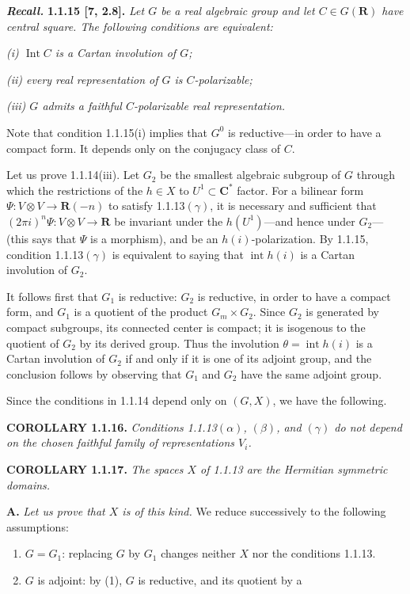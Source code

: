 \documentclass[10pt,a4paper]{article}
\begin{document}
\textbf{\emph{Recall.}} \textbf{1.1.15 {[}7, 2.8{]}.} \emph{Let \(G\) be a real algebraic group and let \(C\in G(\mathbf R)\) have central square. The following conditions are equivalent:}

\emph{(i) \(\operatorname{Int}C\) is a Cartan involution of \(G\);}

\emph{(ii) every real representation of \(G\) is \(C\)-polarizable;}

\emph{(iii) \(G\) admits a faithful \(C\)-polarizable real representation.}

Note that condition 1.1.15(i) implies that \(G^0\) is reductive---in order to have a compact form. It depends only on the conjugacy class of \(C\).

Let us prove 1.1.14(iii). Let \(G_2\) be the smallest algebraic subgroup of \(G\) through which the restrictions of the \(h\in X\) to \(U^1\subset\mathbf C^*\) factor. For a bilinear form \(\Psi:V\otimes V\to\mathbf R(-n)\) to satisfy 1.1.13\((\gamma)\), it is necessary and sufficient that \((2\pi i)^n\Psi:V\otimes V\to\mathbf R\) be invariant under the \(h(U^1)\)---and hence under \(G_2\)---(this says that \(\Psi\) is a morphism), and be an \(h(i)\)-polarization. By 1.1.15, condition 1.1.13\((\gamma)\) is equivalent to saying that \(\operatorname{int}h(i)\) is a Cartan involution of \(G_2\).

It follows first that \(G_1\) is reductive: \(G_2\) is reductive, in order to have a compact form, and \(G_1\) is a quotient of the product \(G_m\times G_2\). Since \(G_2\) is generated by compact subgroups, its connected center is compact; it is isogenous to the quotient of \(G_2\) by its derived group. Thus the involution \(\theta=\operatorname{int}h(i)\) is a Cartan involution of \(G_2\) if and only if it is one of its adjoint group, and the conclusion follows by observing that \(G_1\) and \(G_2\) have the same adjoint group.

Since the conditions in 1.1.14 depend only on \((G,X)\), we have the following.

\textbf{COROLLARY 1.1.16.} \emph{Conditions 1.1.13\((\alpha)\), \((\beta)\), and \((\gamma)\) do not depend on the chosen faithful family of representations \(V_i\).}

\textbf{COROLLARY 1.1.17.} \emph{The spaces \(X\) of 1.1.13 are the Hermitian symmetric domains.}

\textbf{A.} \emph{Let us prove that \(X\) is of this kind.} We reduce successively to the following assumptions:

\begin{enumerate}
\def\labelenumi{(\arabic{enumi})}
\item
  \(G=G_1\): replacing \(G\) by \(G_1\) changes neither \(X\) nor the conditions 1.1.13.
\item
  \(G\) is adjoint: by (1), \(G\) is reductive, and its quotient by a
\end{enumerate}
\end{document}
